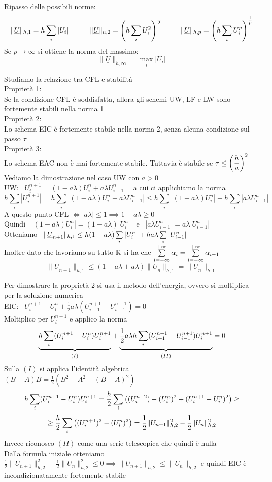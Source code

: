 \documentclass{article}
\renewcommand{\vv}[1]{\underline{#1}}
\begin{document}
Ripasso delle possibili norme:
\[
\|\vv{U}\|_{h,1} = h \sum_i |U_i|
\hspace{30pt}
\|\vv{U}\|_{h,2} = \O h \sum_i U_i^2\C^{\tfrac{1}{2}}
\hspace{25pt}
\|\vv{U}\|_{h,p} = \O h \sum_i U_i^p\C^{\tfrac{1}{p}}
\]
Se $p\to\infty$ si ottiene la norma del massimo: 
\[
\|\vv{U}\|_{h,\infty} = \max_i |U_i|
\]
\phantom{}

Studiamo la relazione tra CFL e stabilità\\
Proprietà 1: \\ Se la condizione CFL è soddisfatta, allora gli schemi UW, LF e LW sono fortemente stabili nella norma 1\\
Proprietà 2: \\ Lo schema EIC è fortemente stabile nella norma 2, senza alcuna condizione sul passo $\tau$\\
Proprietà 3: \\ Lo schema EAC non è mai fortemente stabile. Tuttavia è stabile se $\tau \le \left(\dfrac{h}{a}\right)^2$\\


Vediamo la dimostrazione nel caso UW con $a>0$\\
UW: \ $U_i^{n+1} = (1-a\lambda)U_i^n + a \lambda U_{i-1}^n$ \ \ a cui ci applichiamo la norma
\[
h \sum_i |U_i^{n+1}|= h\sum_i |(1-a\lambda)U_i^n + a \lambda U_{i-1}^n|\le h \sum_i |(1-a\lambda)U_i^n|+ h \sum_i |a\lambda U_{i-1}^n|
\]
A questo punto CFL $\Longleftrightarrow |a\lambda|\le 1 \implies 1-a\lambda\ge 0$\\
Quindi \ $|(1-a\lambda)U_i^n|=(1-a\lambda)|U_i^n|$ \ e \ $|a\lambda U_{i-1}^n|= a\lambda|U_{i-1}^n|$\\
Otteniamo \ $\|\vv{U}_{n+1}\|_{h,1}\le h (1-a\lambda)\Sum{i}{}|U_i^n|+ha\lambda\Sum{i}{}|U_{i-1}^n|$\\
Inoltre dato che lavoriamo su tutto $\mathbb R$ si ha che $\sum\limits_{i=-\infty}^{+\infty}\alpha_i = \sum\limits_{i=-\infty}^{+\infty}\alpha_{i-1}$
\[
\|\vv{U}_{n+1}\|_{h,1}\le (1-a\lambda + a \lambda) \|\vv{U}_n\|_{h,1} = \|\vv{U}_n\|_{h,1}
\]
\phantom{}

Per dimostrare la proprietà 2 si usa il metodo dell'energia, ovvero si moltiplica per la soluzione numerica\\
EIC: \ $U_i^{n+1} - U_i^n + \frac12 a \lambda (U_{i+1}^{n+1} - U_{i-1}^{n+1})=0$\\
Moltiplico per $U_i^{n+1}$ e applico la norma
\[
\underset{(I)}{\underbrace{h\sum_i (U_i^{n+1}-U_i^n)U_i^{n+1}}} + \underset{(II)}{\underbrace{\dfrac12 a \lambda h \sum_i (U_{i+1}^{n+1}-U_{i-1}^{n+1})U_i^{n+1}}}=0
\]
Sulla $(I)$ si applica l'identità algebrica \ $(B-A)B=\frac12 (B^2-A^2+(B-A)^2)$
\[
h\sum_i (U_i^{n+1}-U_i^n)U_i^{n+1} = \dfrac{h}{2} \sum_i \left( (U_i^{n+2})- (U_i^n)^2 + (U_i^{n+1}-U_i^n)^2 \right) \ge\]
\[
\ge\dfrac{h}{2} \sum_i \left( (U_i^{n+1})^2 - (U_i^n)^2 \right) = \dfrac12 \|U_{n+1}\|_{h,2}^2 - \dfrac12 \|U_n\|^2_{h,2}
\]
Invece riconosco $(II)$ come una serie telescopica che quindi è nulla\\
Dalla formula iniziale otteniamo $\frac12 \|U_{n+1}\|_{h,2}^2 - \frac12 \|U_n\|^2_{h,2} \le 0 \implies \|U_{n+1}\|_{h,2}\le \|U_n\|_{h,2}$ e quindi EIC è incondizionatamente fortemente stabile\\
\end{document}
